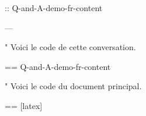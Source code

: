 \documentclass[%
  scroll,
]{Q-and-A}
\begin{document}
:: {Q-and-A-demo-fr-content}


---

"
  Voici le code de cette conversation.

  == {Q-and-A-demo-fr-content}

"
  Voici le code du document principal.

  == [latex] {\jobname}
\end{document}
